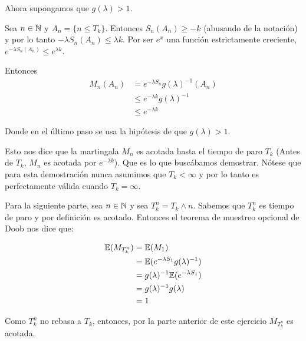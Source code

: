     Ahora supongamos que $g(\lambda) > 1$.\par\null
    
    Sea $n \in\mathbb{N}$ y $A_n = \{ n \leq T_k \}$. Entonces $S_n(A_n) \geq -k$  (abusando de la notación) y por lo tanto
    $-\lambda S_n(A_n) \leq \lambda k$. Por ser $e^x$ una función estrictamente creciente, 
    $e^{-\lambda S_n(A_n)} \leq e^{\lambda k}$.\par\null
    
    Entonces
    \begin{align}
        M_n(A_n)    &=      e^{-\lambda S_n} g(\lambda)^{-1} (A_n) \\
                    &\leq   e^{-\lambda k} g(\lambda)^{-1}         \\
                    &\leq   e^{-\lambda k}                         
    \end{align}
    
    Donde en el último paso se usa la hipótesis de que $g(\lambda) > 1$.\par\null

    Esto nos dice que la martingala $M_n$ es acotada hasta el tiempo de paro $T_k$ 
    (Antes de $T_k$, $M_n$ es acotada por $e^{-\lambda k}$). Que es lo que buscábamos demostrar.
    Nótese que para esta demostración nunca asumimos que $T_k  < \infty$ y por lo tanto
    es perfectamente válida cuando $T_k = \infty$.\par\null
    
    Para la siguiente parte, sea $n \in \mathbb{N}$ y sea $T_k^n = T_k \wedge n$. 
    Sabemos que $T_k^n$ es tiempo de paro y por definición es acotado. Entonces el teorema de 
    muestreo opcional de Doob nos dice que:
    
    \begin{align}
        \mathbb{E}(M_{T_k^n})   &=  \mathbb{E}(M_1)                                 \\
                        &=  \mathbb{E}(e^{-\lambda S_1} g(\lambda)^{-1})    \\
                        &=  g(\lambda)^{-1}\mathbb{E}(e^{-\lambda S_1})     \\
                        &=  g(\lambda)^{-1} g(\lambda)              \\
                        &=  1
    \end{align}\par\null
    
    Como $T_k^n$ no rebasa a $T_k$, entonces, por la parte anterior de este ejercicio $M_{T_k^n}$ es acotada.\par\null
    
